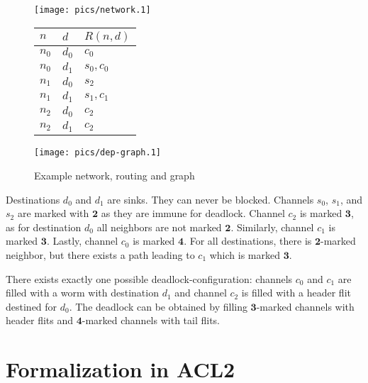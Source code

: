\documentclass[submission,copyright]{eptcs}
\begin{document}
\begin{figure}[htbp]
\centering
\begin{minipage}[b]{0.32\linewidth}\centering
        \texttt{[image: pics/network.1]}
\end{minipage}
\begin{minipage}[b]{0.32\linewidth}\centering
        \begin{tabular}{l|l|l}
        $n$ & $d$ & $R(n, d)$\\\hline\hline
        $n_0$ & $d_0$ & $c_0$\\
        $n_0$ & $d_1$ & $s_0, c_0$\\
        $n_1$ & $d_0$ & $s_2$\\
        $n_1$ & $d_1$ & $s_1, c_1$\\
        $n_2$ & $d_0$ & $c_2$\\
        $n_2$ & $d_1$ & $c_2$\\\hline
        \end{tabular}

        \vspace{0em}
\end{minipage}
\begin{minipage}[b]{0.32\linewidth}\centering
        \texttt{[image: pics/dep-graph.1]}
\end{minipage}
\caption{Example network, routing and graph}
\label{fig:ex-trace}
\end{figure}


Destinations $d_0$ and $d_1$ are sinks. They can never be blocked. Channels $s_0$, $s_1$, and $s_2$ are marked with $\mathbf{2}$ as they are immune for deadlock.
Channel $c_2$ is marked $\mathbf{3}$, as for destination $d_0$ all neighbors are not marked $\mathbf{2}$.
Similarly, channel $c_1$ is marked $\mathbf{3}$.
Lastly, channel $c_0$ is marked $\mathbf{4}$. For all destinations, there is $\mathbf{2}$-marked neighbor, but there exists a path leading to $c_1$ which is marked $\mathbf{3}$.

There exists exactly one possible deadlock-configuration: channels $c_0$ and $c_1$ are filled with a worm with destination $d_1$ and channel $c_2$ is filled with a header flit destined for $d_0$.
The deadlock can be obtained by filling $\mathbf{3}$-marked channels with header flits and $\mathbf{4}$-marked channels with tail flits. 




\section{Formalization in ACL2}\label{sec:formalizing}
\end{document}
